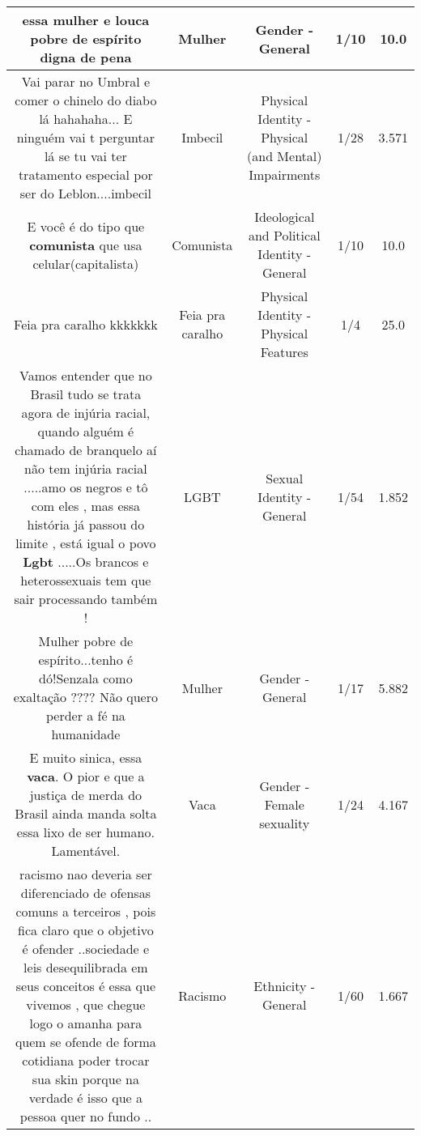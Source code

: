 \documentclass[11pt]{article}
\newlength\mylength
\begin{document}
\begin{center}
\begin{longtable}{|C{.65\mylength}|C{.30\mylength}|C{.12\mylength}|C{.12\mylength}|C{.12\mylength}|}
  \small essa \textbf{mulher} e louca pobre de espírito digna de pena\normalsize   & Mulher & Gender - General & 1/10 & 10.0 \\  \hline
  \small Vai parar no Umbral e comer o chinelo do diabo lá hahahaha... E ninguém vai t perguntar lá se tu vai ter tratamento especial por ser do Leblon....imbecil\normalsize   & Imbecil & Physical Identity - Physical (and Mental) Impairments & 1/28 & 3.571 \\  \hline
  \small E você é do tipo que \textbf{comunista} que usa celular(capitalista)\normalsize   & Comunista & Ideological and Political Identity - General & 1/10 & 10.0 \\  \hline
  \small Feia pra caralho kkkkkkk\normalsize   & Feia pra caralho & Physical Identity - Physical Features & 1/4 & 25.0 \\  \hline
  \small Vamos entender  que  no Brasil   tudo se trata agora de injúria  racial, quando  alguém  é  chamado de branquelo aí não tem injúria racial .....amo os negros e tô com eles , mas essa história  já passou  do limite , está  igual  o povo \textbf{Lgbt} .....Os brancos  e heterossexuais  tem  que  sair  processando  também  !\normalsize   & LGBT & Sexual Identity - General & 1/54 & 1.852 \\  \hline
  \small Mulher pobre de espírito...tenho é dó!Senzala como exaltação ???? Não quero perder a fé na humanidade\normalsize   & Mulher & Gender - General & 1/17 & 5.882 \\  \hline
  \small E muito sinica, essa \textbf{vaca}. O pior e que a justiça de merda do Brasil ainda manda solta essa lixo de ser humano. Lamentável.\normalsize   & Vaca & Gender - Female sexuality & 1/24 & 4.167 \\  \hline
  \small racismo nao deveria ser diferenciado de ofensas comuns a terceiros , pois fica claro que o objetivo é ofender ..sociedade e leis desequilibrada em seus conceitos é essa que vivemos , que chegue logo o amanha para quem se ofende de forma cotidiana poder trocar sua skin porque na verdade é isso que a pessoa quer no fundo ..\normalsize   & Racismo & Ethnicity - General & 1/60 & 1.667 \\  \hline

\end{longtable}
\end{center}
\end{document}
